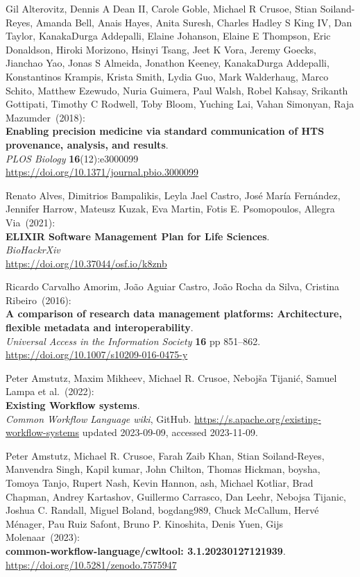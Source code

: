 \begin{thebibliography}{9}
Gil Alterovitz, Dennis A Dean II, Carole Goble, Michael R Crusoe, Stian Soiland-Reyes, Amanda Bell, Anais Hayes, Anita Suresh, Charles Hadley S King IV, Dan Taylor, KanakaDurga Addepalli, Elaine Johanson, Elaine E Thompson, Eric Donaldson, Hiroki Morizono, Hsinyi Tsang, Jeet K Vora, Jeremy Goecks, Jianchao Yao, Jonas S Almeida, Jonathon Keeney, KanakaDurga Addepalli, Konstantinos Krampis, Krista Smith, Lydia Guo, Mark Walderhaug, Marco Schito, Matthew Ezewudo, Nuria Guimera, Paul Walsh, Robel Kahsay, Srikanth Gottipati, Timothy C Rodwell, Toby Bloom, Yuching Lai, Vahan Simonyan, Raja Mazumder~(2018): \\
\textbf{Enabling precision medicine via standard communication of HTS provenance, analysis, and results}.\\
\emph{PLOS Biology} \textbf{16}(12):e3000099\\
\url{https://doi.org/10.1371/journal.pbio.3000099}

Renato Alves, Dimitrios Bampalikis, Leyla Jael Castro, José María Fernández, Jennifer Harrow, Mateusz Kuzak, Eva Martin, Fotis E. Psomopoulos, Allegra Via~(2021): \\
\textbf{ELIXIR Software Management Plan for Life Sciences}.\\
\emph{BioHackrXiv}\\
\url{https://doi.org/10.37044/osf.io/k8znb}

Ricardo Carvalho Amorim, João Aguiar Castro, João Rocha da Silva, Cristina Ribeiro~(2016): \\
\textbf{A comparison of research data management platforms: Architecture, flexible metadata and interoperability}.\\
\emph{Universal Access in the Information Society} \textbf{16} pp
851--862.\\
\url{https://doi.org/10.1007/s10209-016-0475-y}

Peter Amstutz, Maxim Mikheev, Michael R. Crusoe, Nebojša Tijanić, Samuel Lampa et al.~(2022): \\
\textbf{Existing Workflow systems}.\\
\emph{Common Workflow Language wiki}, GitHub. 
\url{https://s.apache.org/existing-workflow-systems} updated 2023-09-09, accessed 2023-11-09.

Peter Amstutz, Michael R. Crusoe, Farah Zaib Khan, Stian Soiland-Reyes, Manvendra Singh, Kapil kumar, John Chilton, Thomas Hickman, boysha, Tomoya Tanjo, Rupert Nash, Kevin Hannon, ash, Michael Kotliar, Brad Chapman, Andrey Kartashov, Guillermo Carrasco, Dan Leehr, Nebojsa Tijanic, Joshua C. Randall, Miguel Boland, bogdang989, Chuck McCallum, Hervé Ménager, Pau Ruiz Safont, Bruno P. Kinoshita, Denis Yuen, Gijs Molenaar~(2023): \\
\textbf{common-workflow-language/cwltool: 3.1.20230127121939}.\\
\url{https://doi.org/10.5281/zenodo.7575947}


\end{thebibliography}

